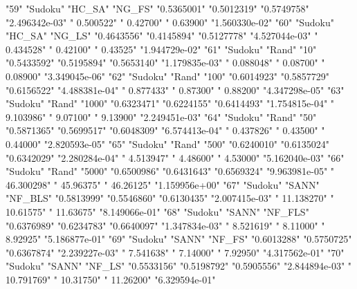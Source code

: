"59" "Sudoku" "HC_SA" "NG_FS" "0.5365001" "0.5012319" "0.5749758" "2.496342e-03" "  0.500522" "  0.42700" "  0.63900" "1.560330e-02"
"60" "Sudoku" "HC_SA" "NG_LS" "0.4643556" "0.4145894" "0.5127778" "4.527044e-03" "  0.434528" "  0.42100" "  0.43525" "1.944729e-02"
"61" "Sudoku" "Rand" "10" "0.5433592" "0.5195894" "0.5653140" "1.179835e-03" "  0.088048" "  0.08700" "  0.08900" "3.349045e-06"
"62" "Sudoku" "Rand" "100" "0.6014923" "0.5857729" "0.6156522" "4.488381e-04" "  0.877433" "  0.87300" "  0.88200" "4.347298e-05"
"63" "Sudoku" "Rand" "1000" "0.6323471" "0.6224155" "0.6414493" "1.754815e-04" "  9.103986" "  9.07100" "  9.13900" "2.249451e-03"
"64" "Sudoku" "Rand" "50" "0.5871365" "0.5699517" "0.6048309" "6.574413e-04" "  0.437826" "  0.43500" "  0.44000" "2.820593e-05"
"65" "Sudoku" "Rand" "500" "0.6240010" "0.6135024" "0.6342029" "2.280284e-04" "  4.513947" "  4.48600" "  4.53000" "5.162040e-03"
"66" "Sudoku" "Rand" "5000" "0.6500986" "0.6431643" "0.6569324" "9.963981e-05" " 46.300298" " 45.96375" " 46.26125" "1.159956e+00"
"67" "Sudoku" "SANN" "NF_BLS" "0.5813999" "0.5546860" "0.6130435" "2.007415e-03" " 11.138270" " 10.61575" " 11.63675" "8.149066e-01"
"68" "Sudoku" "SANN" "NF_FLS" "0.6376989" "0.6234783" "0.6640097" "1.347834e-03" "  8.521619" "  8.11000" "  8.92925" "5.186877e-01"
"69" "Sudoku" "SANN" "NF_FS" "0.6013288" "0.5750725" "0.6367874" "2.239227e-03" "  7.541638" "  7.14000" "  7.92950" "4.317562e-01"
"70" "Sudoku" "SANN" "NF_LS" "0.5533156" "0.5198792" "0.5905556" "2.844894e-03" " 10.791769" " 10.31750" " 11.26200" "6.329594e-01"
